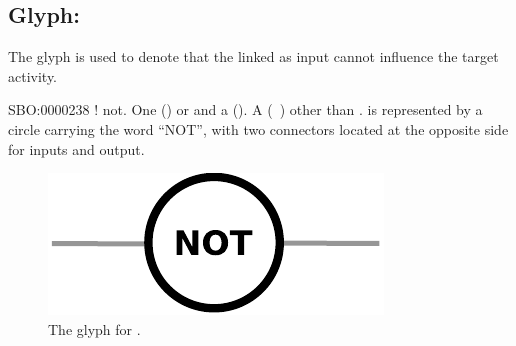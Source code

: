 \subsection{Glyph: }
\label{sec:af:not}

The glyph  is used to denote that the  linked as input cannot influence the target activity.

\begin{glyphDescription}
 \glyphSboTerm SBO:0000238 ! not.
 \glyphOrigin One  () or and a  ().
 \glyphTarget A  (~) other than .
 \glyphNode {} is represented by a circle carrying the word ``NOT'', with two connectors located at the opposite side for inputs and output.
 \end{glyphDescription}

\begin{figure}[H]
  \centering
  \includegraphics[scale = 0.5]{images/not}
  \caption{The \AF glyph for .}
  \label{fig:af:not}
\end{figure}
